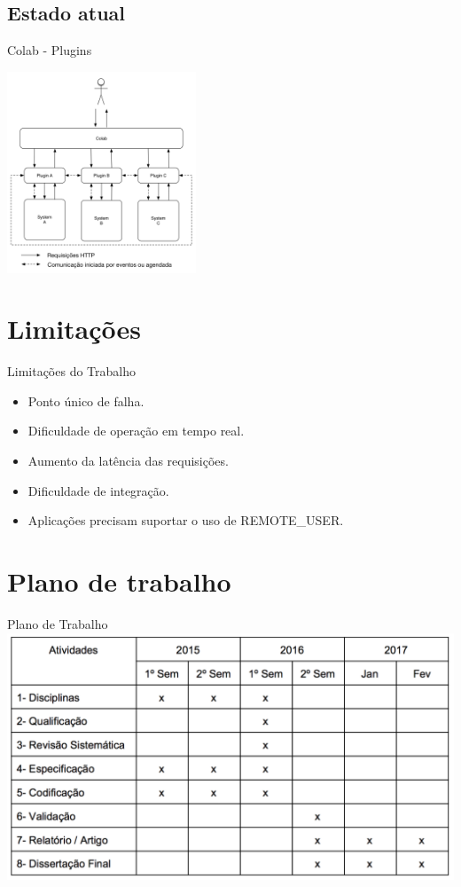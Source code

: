 \documentclass{beamer}
\begin{document}
\subsection*{Estado atual}

\begin{frame}{Colab - Plugins}
  \begin{center}
    \includegraphics[height=6.0cm]{colab-plugins}
  \end{center}
\end{frame}

\section{Limitações}

\begin{frame}{Limitações do Trabalho}
  \begin{itemize}
  \item {
    Ponto único de falha.
  }
  \item {
    Dificuldade de operação em tempo real.
  }
  \item {
    Aumento da latência das requisições.
  }
  \item{
    Dificuldade de integração.
  }
  \item{
    Aplicações precisam suportar o uso de REMOTE\_USER.
  }
  \end{itemize}
\end{frame}

\section{Plano de trabalho}

\begin{frame}{Plano de Trabalho}
    \includegraphics[scale=0.4]{plano_de_trabalho}
\end{frame}
\end{document}
